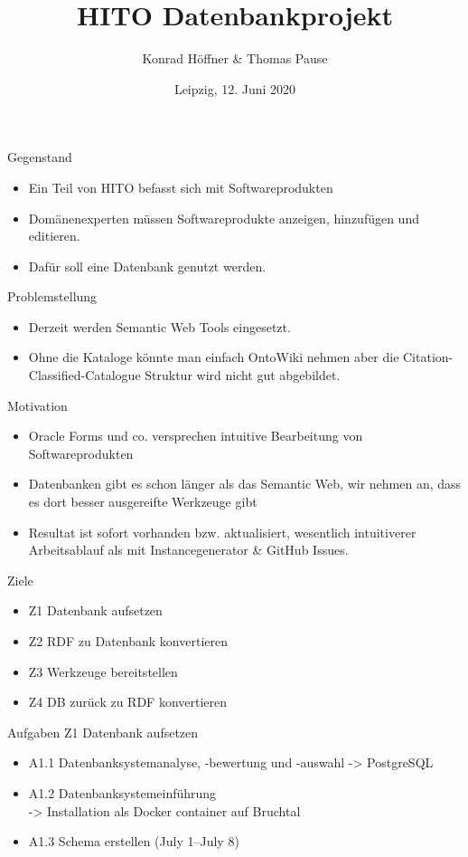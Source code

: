 \documentclass[aspectratio=169]{beamer}
\author{Konrad Höffner \& Thomas Pause}
\date{Leipzig, 12. Juni 2020}
\title{HITO Datenbankprojekt}
\subtitle{}
\begin{document}
\begin{frame}
\titlepage
\end{frame}

\begin{frame}{Gegenstand}
\begin{itemize}
\item Ein Teil von HITO befasst sich mit Softwareprodukten
\item Domänenexperten müssen Softwareprodukte anzeigen, hinzufügen und editieren.
\item Dafür soll eine Datenbank genutzt werden.
\end{itemize}
\end{frame}

\begin{frame}{Problemstellung}
\begin{itemize}
\item Derzeit werden Semantic Web Tools eingesetzt.
\item Ohne die Kataloge könnte man einfach OntoWiki nehmen aber die Citation-Classified-Catalogue Struktur wird nicht gut abgebildet.
\end{itemize}
\end{frame}

\begin{frame}{Motivation}
\begin{itemize}
\item Oracle Forms und co. versprechen intuitive Bearbeitung von Softwareprodukten
\item Datenbanken gibt es schon länger als das Semantic Web, wir nehmen an, dass es dort besser ausgereifte Werkzeuge gibt
\item Resultat ist sofort vorhanden bzw. aktualisiert, wesentlich intuitiverer Arbeitsablauf als mit Instancegenerator \& GitHub Issues.
\end{itemize}
\end{frame}
\begin{frame}{Ziele}
\begin{itemize}
\item Z1 Datenbank aufsetzen \checkmark
\item Z2 RDF zu Datenbank konvertieren
\item Z3 Werkzeuge bereitstellen
\item Z4 DB zurück zu RDF konvertieren
\end{itemize}
\end{frame}

\begin{frame}{Aufgaben Z1 Datenbank aufsetzen}
\begin{itemize}
\item A1.1 Datenbanksystemanalyse, -bewertung und -auswahl -> PostgreSQL \checkmark
\item A1.2 Datenbanksystemeinführung\\-> Installation als Docker container auf Bruchtal \checkmark
\item A1.3 Schema erstellen (July 1--July 8) \checkmark
\end{itemize}
\end{frame}
\end{document}
